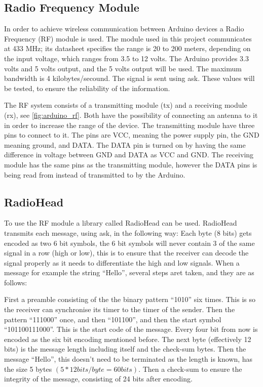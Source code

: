 \subsection{Radio Frequency Module} \label{rfmodule}
In order to achieve wireless communication between Arduino devices a Radio Frequency (RF) module is used.
The module used in this project communicates at 433 MHz; its datasheet specifies the range is 20 to 200 meters, depending on the input voltage, which ranges from 3.5 to 12 volts. 
The Arduino provides 3.3 volts and 5 volts output, and the 5 volts output will be used.
The maximum bandwidth is 4 kilobytes/secound. 
The signal is sent using \gls{ask}.
These values will be tested, to ensure the reliability of the information. 

The RF system consists of a transmitting module (tx) and a receiving module (rx), see \ref{fig:arduino_rf}.
Both have the possibility of connecting an antenna to it in order to increase the range of the device.
The transmitting module have three pins to connect to it.
The pins are VCC, meaning the power supply pin, the GND meaning ground, and DATA.
The DATA pin is turned on by having the same difference in voltage between GND and DATA as VCC and GND. 
The receiving module has the same pins as the transmitting module, however the DATA pins is being read from instead of transmitted to by the Arduino.


\subsection{RadioHead}\label{subsec:RadioHead}

To use the RF module a library called RadioHead can be used. 
RadioHead transmits each message, using \gls{ask}, in the following way:
Each byte (8 bits) gets encoded as two 6 bit symbols, the 6 bit symbols will never contain 3 of the same signal in a row (high or low), this is to ensure that the receiver can decode the signal properly as it needs to differentiate the high and low signals.
When a message for example the string \enquote{Hello}, several steps aret taken, and they are as follows:

First a preamble consisting of the the binary pattern \enquote{1010} six times. 
This is so the receiver can synchronise its timer to the timer of the sender.
Then the pattern \enquote{111000} once, and then \enquote{101100}, and then the start symbol \enquote{101100111000}. 
This is the start code of the message. 
Every four bit from now is encoded as the six bit encoding mentioned before.
The next byte (effectively 12 bits) is the message length including itself and the check-sum bytes.
Then the message \enquote{Hello}, this doesn't need to be terminated as the length is known, has the size 5 bytes $(5 * 12 bits/byte = 60 bits)$.
Then a check-sum to ensure the integrity of the message, consisting of 24 bits after encoding.

